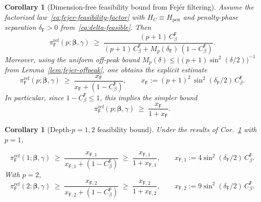 \documentclass[a4paper,unpublished,onecolumn,11pt]{quantumarticle}
\newtheorem{corollary}[theorem]{Corollary}
\theoremstyle{definition}
\theoremstyle{remark}
\begin{document}
\begin{appendix}
\begin{corollary}[Dimension-free feasibility bound from Fej\'er filtering]
\label{thm:fejer-feasibility}
Assume the factorized law~\eqref{eq:fejer-feasibility-factor} with $H_C\equiv H_{\mathrm{pen}}$
and penalty-phase separation $\delta_{\mathsf F}>0$ from~\eqref{eq:delta-feasible}.
Then
\begin{equation}
\label{eq:fejer-feasibility-bound}
\pi_{\mathsf F}^{\mathrm{ref}}(p;\boldsymbol\beta,\gamma)
\;\ge\;
\frac{(p+1)\,C_{\beta}^{\mathsf F}}
{(p+1)\,C_{\beta}^{\mathsf F}+M_p(\delta_{\mathsf F})\,(1-C_{\beta}^{\mathsf F})}.
\end{equation}
Moreover, using the uniform off-peak bound $M_p(\delta)\le\bigl((p+1)\sin^2(\delta/2)\bigr)^{-1}$
from Lemma~\ref{lem:fejer-offpeak}, one obtains the explicit estimate
\begin{equation}
\label{eq:fejer-feasibility-ratio-correct}
\pi_{\mathsf F}^{\mathrm{ref}}(p;\boldsymbol\beta,\gamma)
\;\ge\;
\frac{x_{\mathsf F}}
{x_{\mathsf F}+(1-C_{\beta}^{\mathsf F})},
\qquad
x_{\mathsf F}:=(p+1)^2\,\sin^2(\delta_{\mathsf F}/2)\,C_{\beta}^{\mathsf F}.
\end{equation}
In particular, since $1-C_{\beta}^{\mathsf F}\le 1$, this implies the simpler bound
\begin{equation}
\label{eq:fejer-feasibility-ratio-simpler}
\pi_{\mathsf F}^{\mathrm{ref}}(p;\boldsymbol\beta,\gamma)
\;\ge\;
\frac{x_{\mathsf F}}{1+x_{\mathsf F}}.
\end{equation}
\end{corollary}




\begin{corollary}[Depth-$p=1,2$ feasibility bound]
\label{cor:fejer-feasibility-p1}
Under the results of Cor.~\ref{thm:fejer-feasibility} with $p=1$,

 \[
\pi_{\mathsf F}^{\mathrm{ref}}(1;\boldsymbol\beta,\gamma)
\;\ge\;
\frac{x_{\mathsf F,1}}{x_{\mathsf F,1}+(1-C_{\beta}^{\mathsf F})}
\;\ge\;
\frac{x_{\mathsf F,1}}{1+x_{\mathsf F,1}},
\qquad
x_{\mathsf F,1}:=4\sin^2(\delta_{\mathsf F}/2)\,C_{\beta}^{\mathsf F}.
\]
With $p=2$,
\[
\pi_{\mathsf F}^{\mathrm{ref}}(2;\boldsymbol\beta,\gamma)
\;\ge\;
\frac{x_{\mathsf F,2}}{x_{\mathsf F,2}+(1-C_{\beta}^{\mathsf F})}
\;\ge\;
\frac{x_{\mathsf F,2}}{1+x_{\mathsf F,2}},
\qquad
x_{\mathsf F,2}:=9\sin^2(\delta_{\mathsf F}/2)\,C_{\beta}^{\mathsf F}.
\]
\end{corollary}




\end{appendix}
\end{document}
